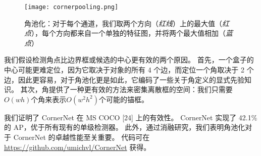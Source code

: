 \documentclass[../main]{subfile}
\begin{document}
\begin{figure}[bh]
    \centering
    \texttt{[image: cornerpooling.png]}
    \caption{角池化：对于每个通道，我们取两个方向（\textit{红线}）上的最大值（\textit{红点}），每个方向都来自一个单独的特征图，并将两个最大值相加（\textit{蓝点}）}
    \label{fig:cornerpooling}
\end{figure}

我们假设检测角点比边界框或候选的中心更有效的两个原因。 首先，一个盒子的中心可能更难定位，因为它取决于对象的所有 4 个边，而定位一个角取决于 2 个边，因此更容易，对于角池化更是如此，它编码了一些关于角定义的显式先验知识。 其次，角提供了一种更有效的方法来密集离散框的空间：我们只需要$ O\left(wh\right) $个角来表示$ O\left(w^2h^2\right) $个可能的锚框。

我们证明了 CornerNet 在 MS COCO [24] 上的有效性。 CornerNet 实现了 42.1\% 的 AP，优于所有现有的单级检测器。 此外，通过消融研究，我们表明角池化对于 CornerNet 的卓越性能至关重要。 代码可在 \href{https://github.com/umichvl/CornerNet}{https://github.com/umichvl/CornerNet} 获得。
\end{document}
